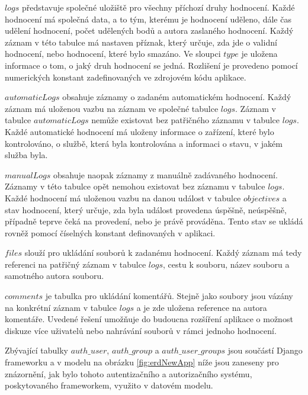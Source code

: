 \documentclass[
  digital, %
  twoside, %
  table,   %
  lof,     %
  lot,     %
]{fithesis3}
\begin{document}
$logs$ představuje společné uložiště pro všechny příchozí druhy hodnocení. Každé hodnocení má společná data, a to tým, kterému je hodnocení uděleno, dále čas udělení hodnocení, počet udělených bodů a autora zaslaného hodnocení. Každý záznam v této tabulce má nastaven příznak, který určuje, zda jde o validní hodnocení, nebo hodnocení, které bylo smazáno. Ve sloupci $type$ je uložena informace o tom, o jaký druh hodnocení se jedná. Rozlišení je provedeno pomocí numerických konstant zadefinovaných ve zdrojovém kódu aplikace.

$automaticLogs$ obsahuje záznamy o zadaném automatickém hodnocení. Každý záznam má uloženou vazbu na záznam ve společné tabulce $logs$. Záznam v tabulce $automaticLogs$ nemůže existovat bez patřičného záznamu v tabulce $logs$. Každé automatické hodnocení má uloženy informace o zařízení, které bylo kontrolováno, o službě, která byla kontrolována a informaci o stavu, v jakém služba byla.

$manualLogs$ obsahuje naopak záznamy z manuálně zadávaného hodnocení. Záznamy v této tabulce opět nemohou existovat bez záznamu v tabulce $logs$. Každé hodnocení má uloženou vazbu na danou událost v tabulce $objectives$ a stav hodnocení, který určuje, zda byla událost provedena úspěšně, neúspěšně, případně  teprve čeká na provedení, nebo je právě prováděna. Tento stav se ukládá rovněž pomocí číselných konstant definovaných v aplikaci.

$files$ slouží pro ukládání souborů k zadanému hodnocení. Každý záznam má tedy referenci na patřičný záznam v tabulce $logs$, cestu k souboru, název souboru a samotného autora souboru.

$comments$ je tabulka pro ukládání komentářů. Stejně jako soubory jsou vázány na konkrétní záznam v tabulce $logs$ a je zde uložena reference na autora komentáře. Uvedené řešení umožňuje do budoucna rozšíření aplikace o možnost diskuze více uživatelů nebo nahrávání souborů v rámci jednoho hodnocení.

Zbývající tabulky $auth\_user$, $auth\_group$ a $auth\_user\_groups$ jsou součástí Django frameworku a v modelu na obrázku \ref{fig:erdNewApp} níže jsou zaneseny pro znázornění, jak bylo tohoto autentizačního a autorizačního systému, poskytovaného frameworkem, využito v datovém modelu.
\end{document}
